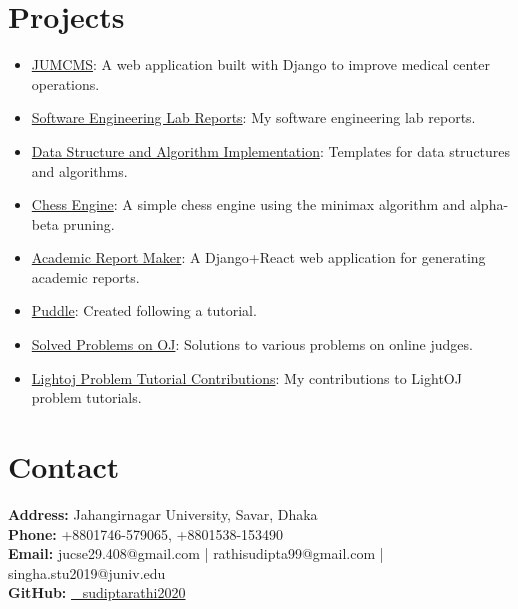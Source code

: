 \documentclass[a4paper,10pt]{article}
\begin{document}
\section*{Projects}
\begin{itemize}
    \item \href{https://github.com/sudiptarathi2020/JUMCMS-Jahangirnagar-University-Medical-Center-Management-System.git}{JUMCMS}: A web application built with Django to improve medical center operations.
    \item \href{https://github.com/sudiptarathi2020/Software-Engineering-Lab-CSE404-Reports.git}{Software Engineering Lab Reports}: My software engineering lab reports.
    \item \href{https://github.com/sudiptarathi2020/Data-structures-and-Algorithms.git}{Data Structure and Algorithm Implementation}: Templates for data structures and algorithms.
    \item \href{https://github.com/sudiptarathi2020/Simple-Chess-Engine.git}{Chess Engine}: A simple chess engine using the minimax algorithm and alpha-beta pruning.
    \item \href{https://github.com/sudiptarathi2020/academic-report-maker.git}{Academic Report Maker}: A Django+React web application for generating academic reports.
    \item \href{https://github.com/sudiptarathi2020/puddle.git}{Puddle}: Created following a tutorial.
    \item \href{https://github.com/sudiptarathi2020/Problem-Solves.git}{Solved Problems on OJ}: Solutions to various problems on online judges.
    \item \href{https://github.com/sudiptarathi2020/problem-tutorials.git}{Lightoj Problem Tutorial Contributions}: My contributions to LightOJ problem tutorials.
\end{itemize}

\section*{Contact}
\textbf{Address:} Jahangirnagar University, Savar, Dhaka\\
\textbf{Phone:} +8801746-579065, +8801538-153490\\
\textbf{Email:} jucse29.408@gmail.com | rathisudipta99@gmail.com | singha.stu2019@juniv.edu\\
\textbf{GitHub:} \href{https://github.com/sudiptarathi2020}{\faGithub ~ sudiptarathi2020}\\
\end{document}
